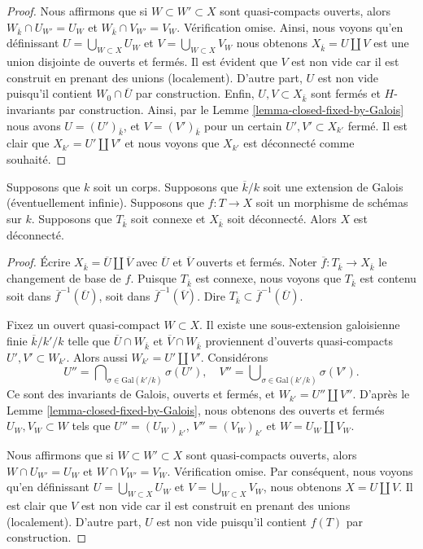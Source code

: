 \begin{proof}
\medskip\noindent
Nous affirmons que si $W \subset W' \subset X$ sont
quasi-compacts ouverts, alors $W_{\overline{k}} \cap U_{W'}
= U_W$ et $W_{\overline{k}} \cap V_{W'} = V_W$. Vérification
omise. Ainsi, nous voyons qu'en définissant $U = \bigcup_{W
\subset X} U_W$ et $V = \bigcup_{W \subset X} V_W$ nous
obtenons $X_{\overline{k}} = U \amalg V$ est une union
disjointe de ouverts et fermés. Il est évident que $V$ est
non vide car il est construit en prenant des unions
(localement). D'autre part, $U$ est non vide puisqu'il contient
$W_0 \cap \overline{U}$ par construction. Enfin, $U, V \subset
X_{\bar k}$ sont fermés et $H$-invariants par construction.
Ainsi, par le Lemme \ref{lemma-closed-fixed-by-Galois} nous
avons $U = (U')_{\bar k}$, et $V = (V')_{\bar k}$ pour un certain
$U', V' \subset X_{k'}$ fermé. Il est clair que $X_{k'} = U'
\amalg V'$ et nous voyons que $X_{k'}$ est déconnecté comme souhaité.
\end{proof}

\begin{lemma}
\label{lemma-tricky}
Supposons que $k$ soit un corps. Supposons que $\overline{k}/k$ soit une
extension de Galois (éventuellement infinie). Supposons que $f : T \to X$
soit un morphisme de schémas sur $k$. Supposons que $T_{\overline{k}}$
soit connexe et $X_{\overline{k}}$ soit déconnecté. Alors $X$ est déconnecté.
\end{lemma}

\begin{proof}
Écrire $X_{\overline{k}} = \overline{U} \amalg \overline{V}$
avec $\overline{U}$ et $\overline{V}$ ouverts et fermés. Noter
$\overline{f} : T_{\overline{k}} \to X_{\overline{k}}$ le
changement de base de $f$. Puisque $T_{\overline{k}}$ est connexe,
nous voyons que $T_{\overline{k}}$ est contenu soit dans
$\overline{f}^{-1}(\overline{U})$, soit dans
$\overline{f}^{-1}(\overline{V})$. Dire $T_{\overline{k}} \subset \overline{f}^{-1}(\overline{U})$.

\medskip\noindent
Fixez un ouvert quasi-compact $W \subset X$. Il
existe une sous-extension galoisienne finie
$\overline{k}/k'/k$ telle que $\overline{U} \cap
W_{\overline{k}}$ et $\overline{V} \cap
W_{\overline{k}}$ proviennent d'ouverts quasi-compacts $U', V'
\subset W_{k'}$. Alors aussi $W_{k'} = U' \amalg V'$. Considérons
$$
U'' = \bigcap\nolimits_{\sigma \in \text{Gal}(k'/k)} \sigma(U'),
\quad
V'' = \bigcup\nolimits_{\sigma \in \text{Gal}(k'/k)} \sigma(V').
$$
Ce sont des invariants de Galois, ouverts et
fermés, et $W_{k'} = U'' \amalg V''$.
D'après le Lemme
\ref{lemma-closed-fixed-by-Galois}, nous obtenons des
ouverts et fermés $U_W, V_W \subset W$ tels que $U'' =
(U_W)_{k'}$, $V'' = (V_W)_{k'}$ et $W = U_W \amalg V_W$.

\medskip\noindent
Nous affirmons que si $W \subset W' \subset X$ sont
quasi-compacts ouverts, alors $W \cap U_{W'} = U_W$ et $W
\cap V_{W'} = V_W$. Vérification omise. Par conséquent,
nous voyons qu'en définissant $U = \bigcup_{W \subset X}
U_W$ et $V = \bigcup_{W \subset X} V_W$, nous obtenons $X =
U \amalg V$. Il est clair que $V$ est non vide car il est
construit en prenant des unions (localement). D'autre part,
$U$ est non vide puisqu'il contient $f(T)$ par construction.
\end{proof}

